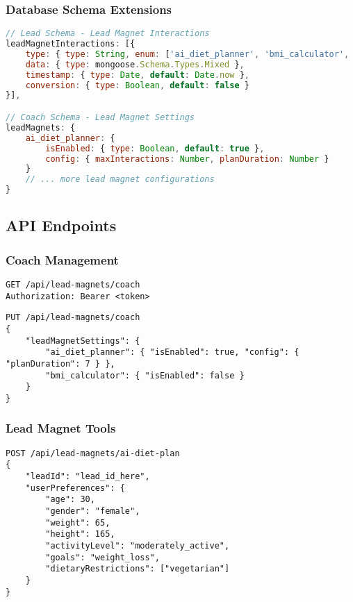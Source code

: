 \documentclass[12pt,a4paper]{article}
\begin{document}
\subsubsection{Database Schema Extensions}
\begin{lstlisting}[language=JavaScript]
// Lead Schema - Lead Magnet Interactions
leadMagnetInteractions: [{
    type: { type: String, enum: ['ai_diet_planner', 'bmi_calculator', ...] },
    data: { type: mongoose.Schema.Types.Mixed },
    timestamp: { type: Date, default: Date.now },
    conversion: { type: Boolean, default: false }
}],

// Coach Schema - Lead Magnet Settings
leadMagnets: {
    ai_diet_planner: {
        isEnabled: { type: Boolean, default: true },
        config: { maxInteractions: Number, planDuration: Number }
    }
    // ... more lead magnet configurations
}
\end{lstlisting}

\subsection{API Endpoints}

\subsubsection{Coach Management}
\begin{lstlisting}[caption=Get Coach Lead Magnets]
GET /api/lead-magnets/coach
Authorization: Bearer <token>
\end{lstlisting}

\begin{lstlisting}[caption=Update Lead Magnet Settings]
PUT /api/lead-magnets/coach
{
    "leadMagnetSettings": {
        "ai_diet_planner": { "isEnabled": true, "config": { "planDuration": 7 } },
        "bmi_calculator": { "isEnabled": false }
    }
}
\end{lstlisting}

\subsubsection{Lead Magnet Tools}
\begin{lstlisting}[caption=Generate AI Diet Plan]
POST /api/lead-magnets/ai-diet-plan
{
    "leadId": "lead_id_here",
    "userPreferences": {
        "age": 30,
        "gender": "female",
        "weight": 65,
        "height": 165,
        "activityLevel": "moderately_active",
        "goals": "weight_loss",
        "dietaryRestrictions": ["vegetarian"]
    }
}
\end{lstlisting}
\end{document}

